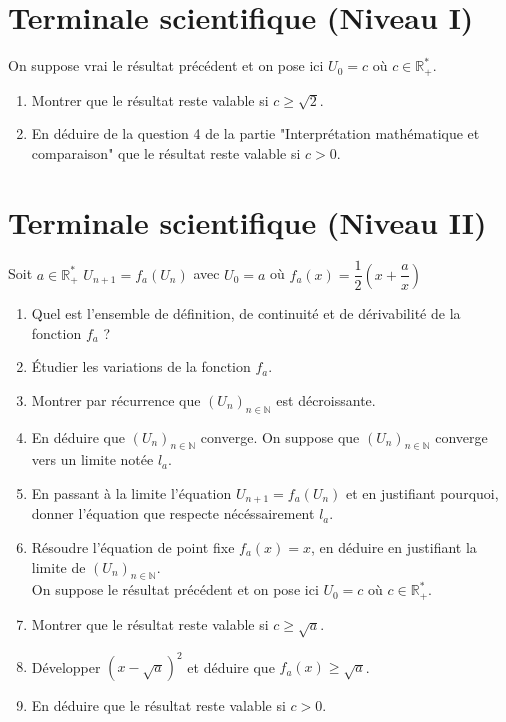 \documentclass[french]{article}
\begin{document}
\section*{Terminale scientifique (Niveau I)}
On suppose vrai le résultat précédent et on pose ici $U_0=c$ où $c\in \mathbb{R}^*_+$.
\begin{enumerate}
\item Montrer que le résultat reste valable si $c\geq \sqrt{2}$.
\item En déduire de la question 4 de la partie "Interprétation mathématique et comparaison" que le résultat reste valable si $c>0$.
\end{enumerate}

\section*{Terminale scientifique (Niveau II)}

Soit $a\in \mathbb{R}_+^*$ $U_{n+1}=f_a(U_n)$ avec $U_0=a$ où $f_a(x)=\dfrac{1}{2}(x+\dfrac{a}{x})$

\begin{enumerate}
\item Quel est l'ensemble de définition, de continuité et de dérivabilité de la fonction $f_a$ ?
\item Étudier les variations de la fonction $f_a$.
\item Montrer par récurrence que $(U_n)_{n\in \mathbb{N}} $ est décroissante.
\item En déduire que $(U_n)_{n\in \mathbb{N}} $ converge.
On suppose que $(U_n)_{n\in \mathbb{N}} $ converge vers un limite notée $l_a$.
\item En passant à la limite l'équation $U_{n+1}=f_a(U_n)$  et en justifiant pourquoi, donner l'équation que respecte nécéssairement $l_a$.
\item Résoudre l'équation de point fixe $f_a(x)=x$, en déduire en justifiant la limite de $(U_n)_{n\in \mathbb{N}} $.\\

On suppose le résultat précédent et on pose ici $U_0=c$ où $c\in \mathbb{R}^*_+$.
\item Montrer que le résultat reste valable si $c\geq \sqrt{a}$.
\item Développer $(x-\sqrt{a})^2$ et déduire que $f_a(x)\geq \sqrt{a}$.
\item En déduire que le résultat reste valable si $c>0$.
\end{enumerate}
\end{document}
